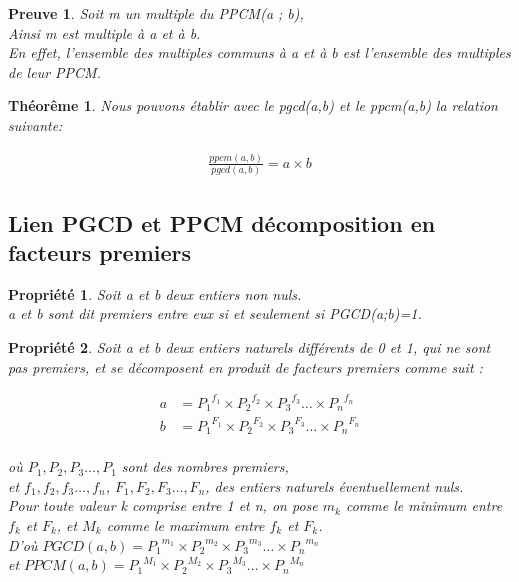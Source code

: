 \documentclass[titlepage]{article}
\newtheorem{Prop}{Propriété}
\newtheorem{proofi}{Preuve}
\newtheorem{theo}{Théorême}
\begin{document}
\begin{proofi} 
Soit m un multiple du PPCM(a ; b),\\
Ainsi m est multiple à a et à b.\\
En effet, l'ensemble des multiples communs à a et à b est l'ensemble des multiples de leur PPCM.
\end{proofi}

\begin{theo}
 Nous pouvons établir avec le pgcd(a,b) et le ppcm(a,b)  la relation suivante:  

	\begin{align*}
	\frac{ppcm(a,b)}{pgcd(a,b)} = a \times b
	\end{align*}
	
\end{theo}

\subsection{Lien PGCD et PPCM décomposition en facteurs 
premiers}
\begin{Prop}
Soit a et b deux entiers non nuls. \\
a et b sont dit premiers entre eux si et seulement si PGCD(a;b)=1.
\end{Prop}

\begin{Prop}
Soit a et b deux entiers naturels différents de 0 et 1, qui ne sont pas premiers, et se décomposent en produit de facteurs premiers comme suit : 

	\begin{align*}
	a & = {P_{1}}^{f_{1}} \times {P_{2}}^{f_{2}} \times {P_{3}}^{f_{3}} … 
\times  {P_{n}}^{f_{n}}\\
	b & = {P_{1}}^{F_{1}} \times {P_{2}}^{F_{2}} \times {P_{3}}^{F_{3}} … 
\times  {P_{n}}^{F_{n}}\\
	\end{align*}

\noindent où $P_{1},P_{2},P_{3} …, P_{1}$ sont des nombres premiers,\\
et $f_{1},f_{2},f_{3} …, f_{n}$, $F_{1},F_{2},F_{3} …, F_{n}$, des entiers naturels éventuellement nuls.\\
Pour toute valeur k comprise entre 1 et n, on pose $m_{k}$ comme le minimum entre $f_{k}$ et $F_{k}$, et $M_{k}$ comme le maximum entre $f_{k}$ et $F_{k}$.\\
D’où $PGCD(a,b) = {P_{1}}^{m_{1}} \times {P_{2}}^{m_{2}} \times {P_{3}}^{m_{3}} … \times  {P_{n}}^{m_{n}}$\\
et $PPCM(a,b) = {P_{1}}^{M_{1}} \times {P_{2}}^{M_{2}} \times {P_{3}}^{M_{3}} … \times  {P_{n}}^{M_{n}}$\\
\end{Prop}
\end{document}
